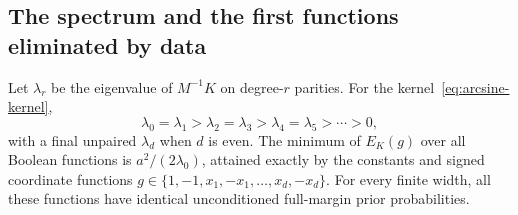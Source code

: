 \subsection{The spectrum and the first functions eliminated by data}

\begin{proposition}
\label{prop:paired-spectrum}
Let $\lambda_r$ be the eigenvalue of $M^{-1}K$ on degree-$r$ parities.
For the kernel~\eqref{eq:arcsine-kernel},
\[
 \lambda_0=\lambda_1>\lambda_2=\lambda_3>
 \lambda_4=\lambda_5>\cdots>0,
\]
with a final unpaired $\lambda_d$ when $d$ is even. The minimum of
$E_K(g)$ over all Boolean functions is $a^2/(2\lambda_0)$, attained
exactly by the constants and signed coordinate functions
$g\in\{1,-1,x_1,-x_1,\ldots,x_d,-x_d\}$.
For every finite width, all these functions have identical
unconditioned full-margin prior probabilities.
\end{proposition}

